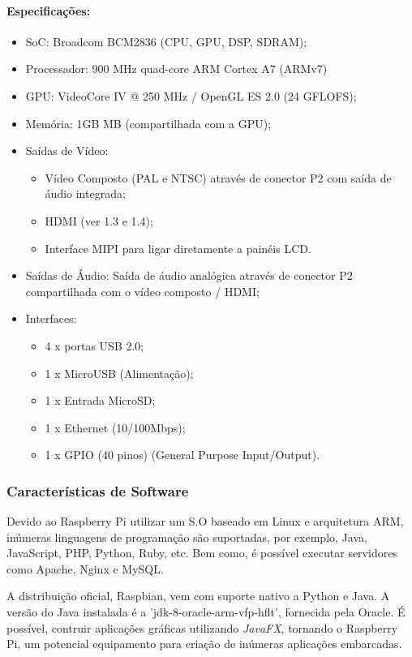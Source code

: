 \paragraph*{Especificações:}
\begin{itemize}
\item SoC: Broadcom BCM2836 (CPU, GPU, DSP, SDRAM);
\item Processador: 900 MHz quad-core ARM Cortex A7 (ARMv7)
\item GPU: VideoCore IV @ 250 MHz / OpenGL ES 2.0 (24 GFLOFS);
\item Memória: 1GB MB (compartilhada com a GPU);
\item Saídas de Vídeo: 

\begin{itemize}
\item Vídeo Composto (PAL e NTSC) através de conector P2 com saída de áudio
integrada;
\item HDMI (ver 1.3 e 1.4);
\item Interface MIPI para ligar diretamente a painéis LCD.
\end{itemize}
\item Saídas de Áudio: Saída de áudio analógica através de conector P2 compartilhada
com o vídeo composto / HDMI;
\item Interfaces:

\begin{itemize}
\item 4 x portas USB 2.0;
\item 1 x MicroUSB (Alimentação);
\item 1 x Entrada MicroSD;
\item 1 x Ethernet (10/100Mbps);
\item 1 x GPIO (40 pinos) (General Purpose Input/Output).
\end{itemize}
\end{itemize}

\subsubsection{Características de Software}

Devido ao Raspberry Pi utilizar um S.O baseado em Linux e arquitetura
ARM, inúmeras linguagens de programação são suportadas\cite{raspberry:langs},
por exemplo, Java, JavaScript, PHP, Python, Ruby, etc. Bem como, é
possível executar servidores como Apache, Nginx e MySQL.

A distribuição oficial, Raspbian\cite{raspberry:os}, vem com suporte
nativo a Python e Java. A versão do Java instalada é a 'jdk-8-oracle-arm-vfp-hflt',
fornecida pela Oracle. É possível, contruir aplicações gráficas utilizando
\emph{JavaFX}\cite{raspberry:javafx}, tornando o Raspberry Pi, um
potencial equipamento para criação de inúmeras aplicações embarcadas.

